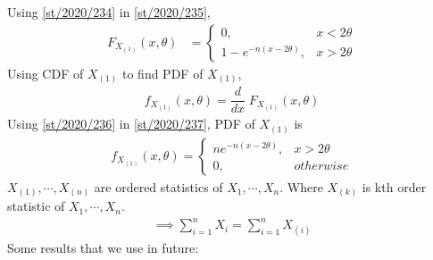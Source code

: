 Using \eqref{st/2020/234} in \eqref{st/2020/235},
\begin{align}
F_{X_{(1)}}(x,\theta)&=
\begin{cases}
0, & x<2\theta
\\
1-e^{-n(x-2\theta)}, & x>2\theta
\end{cases}\label{st/2020/236}
\end{align}
Using CDF of $X_{(1)}$ to find PDF of ${X_{(1)}}$,
\begin{align}
    f_{X_{(1)}}(x,\theta)= \dfrac{d}{dx}\;F_{X_{(1)}}(x,\theta)\label{st/2020/237}
\end{align}
Using \eqref{st/2020/236} in \eqref{st/2020/237}, PDF of $X_{(1)}$ is
\begin{align}
f_{X_{(1)}}{(x,\theta)}=
\begin{cases}
n e^{-n(x-2\theta)}, & x>2\theta
\\
0, & otherwise
\end{cases}\label{st/2020/238}
\end{align}
$X_{(1)},\cdots,X_{(n)}$ are ordered statistics of $X_1,\cdots,X_n$.
Where $X_{(k)}$ is kth order statistic of $X_1,\cdots,X_n$.
\begin{align}
    \implies \sum\limits_{i=1}^n X_i = \sum\limits_{i=1}^n X_{(i)}\label{st/2020/23a_2}
\end{align}
Some results that we use in future:

